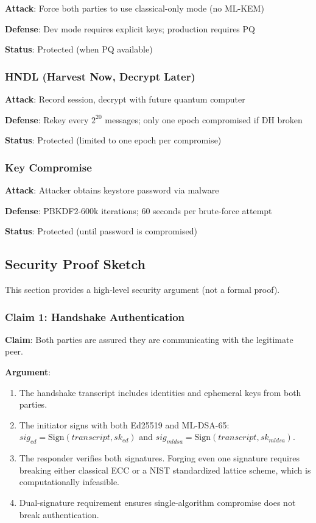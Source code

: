 \documentclass[11pt,a4paper,oneside]{article}
\begin{document}
\textbf{Attack}: Force both parties to use classical-only mode (no ML-KEM)

\textbf{Defense}: Dev mode requires explicit keys; production requires PQ

\textbf{Status}: \checkmark Protected (when PQ available)

\subsubsection{HNDL (Harvest Now, Decrypt Later)}

\textbf{Attack}: Record session, decrypt with future quantum computer

\textbf{Defense}: Rekey every $2^{20}$ messages; only one epoch compromised if DH broken

\textbf{Status}: \checkmark Protected (limited to one epoch per compromise)

\subsubsection{Key Compromise}

\textbf{Attack}: Attacker obtains keystore password via malware

\textbf{Defense}: PBKDF2-600k iterations; 60 seconds per brute-force attempt

\textbf{Status}: \checkmark Protected (until password is compromised)

\subsection{Security Proof Sketch}

This section provides a high-level security argument (not a formal proof).

\subsubsection{Claim 1: Handshake Authentication}

\textbf{Claim}: Both parties are assured they are communicating with the legitimate peer.

\textbf{Argument}:
\begin{enumerate}
\item The handshake transcript includes identities and ephemeral keys from both parties.
\item The initiator signs with both Ed25519 and ML-DSA-65: $sig_{ed} = \text{Sign}(transcript, sk_{ed})$ and $sig_{mldsa} = \text{Sign}(transcript, sk_{mldsa})$.
\item The responder verifies both signatures. Forging even one signature requires breaking either classical ECC or a NIST standardized lattice scheme, which is computationally infeasible.
\item Dual-signature requirement ensures single-algorithm compromise does not break authentication.
\end{enumerate}
\end{document}
